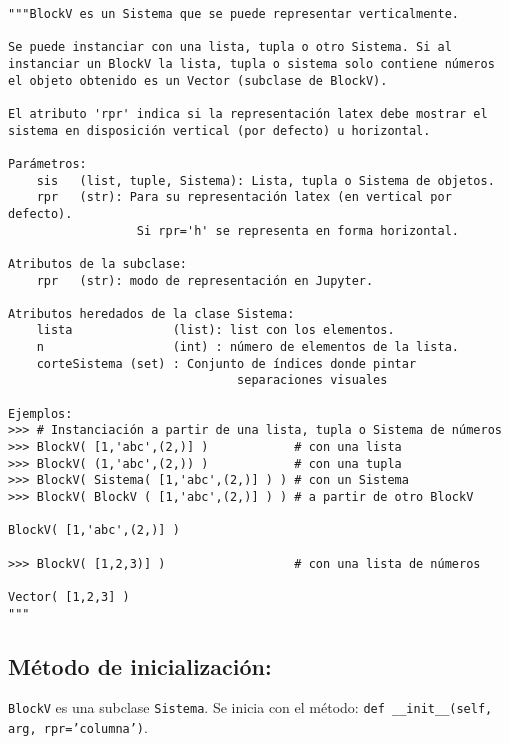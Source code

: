 \documentclass[11pt]{report}
\begin{document}
\begin{verbatim}
"""BlockV es un Sistema que se puede representar verticalmente.

Se puede instanciar con una lista, tupla o otro Sistema. Si al
instanciar un BlockV la lista, tupla o sistema solo contiene números
el objeto obtenido es un Vector (subclase de BlockV).

El atributo 'rpr' indica si la representación latex debe mostrar el
sistema en disposición vertical (por defecto) u horizontal.

Parámetros:
    sis   (list, tuple, Sistema): Lista, tupla o Sistema de objetos.
    rpr   (str): Para su representación latex (en vertical por defecto).
                  Si rpr='h' se representa en forma horizontal. 

Atributos de la subclase:
    rpr   (str): modo de representación en Jupyter.

Atributos heredados de la clase Sistema:
    lista              (list): list con los elementos.
    n                  (int) : número de elementos de la lista.
    corteSistema (set) : Conjunto de índices donde pintar
                                separaciones visuales

Ejemplos:
>>> # Instanciación a partir de una lista, tupla o Sistema de números
>>> BlockV( [1,'abc',(2,)] )            # con una lista
>>> BlockV( (1,'abc',(2,)) )            # con una tupla
>>> BlockV( Sistema( [1,'abc',(2,)] ) ) # con un Sistema
>>> BlockV( BlockV ( [1,'abc',(2,)] ) ) # a partir de otro BlockV

BlockV( [1,'abc',(2,)] )

>>> BlockV( [1,2,3)] )                  # con una lista de números

Vector( [1,2,3] )
"""
\end{verbatim}

\subsection{Método de inicialización:}
\label{sec:org1207377}

\texttt{BlockV} es una subclase \texttt{Sistema}. Se inicia con el método: \texttt{def
\_\_init\_\_(self, arg, rpr='columna')}.
\end{document}
